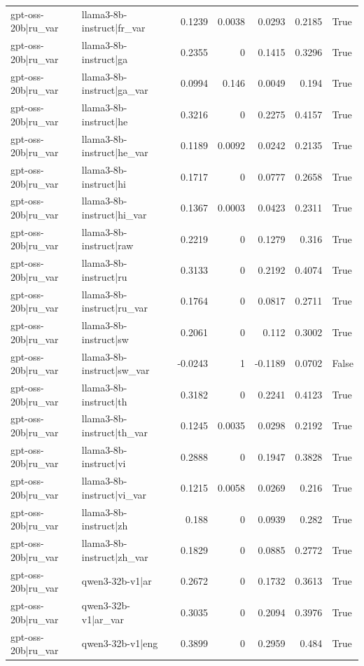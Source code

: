 \begin{table}
\begin{tabular}{l l r r r r l}
gpt-oss-20b|ru_var & llama3-8b-instruct|fr_var & 0.1239 & 0.0038 & 0.0293 & 0.2185 & True \\
gpt-oss-20b|ru_var & llama3-8b-instruct|ga & 0.2355 & 0 & 0.1415 & 0.3296 & True \\
gpt-oss-20b|ru_var & llama3-8b-instruct|ga_var & 0.0994 & 0.146 & 0.0049 & 0.194 & True \\
gpt-oss-20b|ru_var & llama3-8b-instruct|he & 0.3216 & 0 & 0.2275 & 0.4157 & True \\
gpt-oss-20b|ru_var & llama3-8b-instruct|he_var & 0.1189 & 0.0092 & 0.0242 & 0.2135 & True \\
gpt-oss-20b|ru_var & llama3-8b-instruct|hi & 0.1717 & 0 & 0.0777 & 0.2658 & True \\
gpt-oss-20b|ru_var & llama3-8b-instruct|hi_var & 0.1367 & 0.0003 & 0.0423 & 0.2311 & True \\
gpt-oss-20b|ru_var & llama3-8b-instruct|raw & 0.2219 & 0 & 0.1279 & 0.316 & True \\
gpt-oss-20b|ru_var & llama3-8b-instruct|ru & 0.3133 & 0 & 0.2192 & 0.4074 & True \\
gpt-oss-20b|ru_var & llama3-8b-instruct|ru_var & 0.1764 & 0 & 0.0817 & 0.2711 & True \\
gpt-oss-20b|ru_var & llama3-8b-instruct|sw & 0.2061 & 0 & 0.112 & 0.3002 & True \\
gpt-oss-20b|ru_var & llama3-8b-instruct|sw_var & -0.0243 & 1 & -0.1189 & 0.0702 & False \\
gpt-oss-20b|ru_var & llama3-8b-instruct|th & 0.3182 & 0 & 0.2241 & 0.4123 & True \\
gpt-oss-20b|ru_var & llama3-8b-instruct|th_var & 0.1245 & 0.0035 & 0.0298 & 0.2192 & True \\
gpt-oss-20b|ru_var & llama3-8b-instruct|vi & 0.2888 & 0 & 0.1947 & 0.3828 & True \\
gpt-oss-20b|ru_var & llama3-8b-instruct|vi_var & 0.1215 & 0.0058 & 0.0269 & 0.216 & True \\
gpt-oss-20b|ru_var & llama3-8b-instruct|zh & 0.188 & 0 & 0.0939 & 0.282 & True \\
gpt-oss-20b|ru_var & llama3-8b-instruct|zh_var & 0.1829 & 0 & 0.0885 & 0.2772 & True \\
gpt-oss-20b|ru_var & qwen3-32b-v1|ar & 0.2672 & 0 & 0.1732 & 0.3613 & True \\
gpt-oss-20b|ru_var & qwen3-32b-v1|ar_var & 0.3035 & 0 & 0.2094 & 0.3976 & True \\
gpt-oss-20b|ru_var & qwen3-32b-v1|eng & 0.3899 & 0 & 0.2959 & 0.484 & True \\

\end{tabular}
\end{table}
